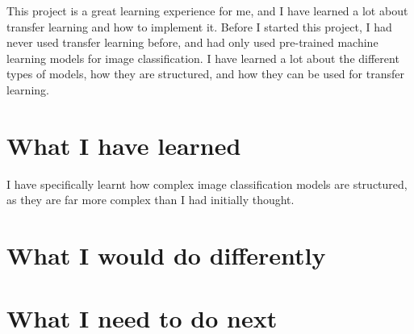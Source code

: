 \documentclass[]{final_report}
\begin{document}
This project is a great learning experience for me, and I have learned a lot about transfer learning and how to implement it.
Before I started this project, I had never used transfer learning before, and had only used pre-trained machine learning models for image classification.
I have learned a lot about the different types of models, how they are structured, and how they can be used for transfer learning.

\section{What I have learned}
I have specifically learnt how complex image classification models are structured, as they are far more complex than I had initially thought.

\section{What I would do differently}

\section{What I need to do next}



\newpage
\printbibliography
\label{endpage}
\end{document}
